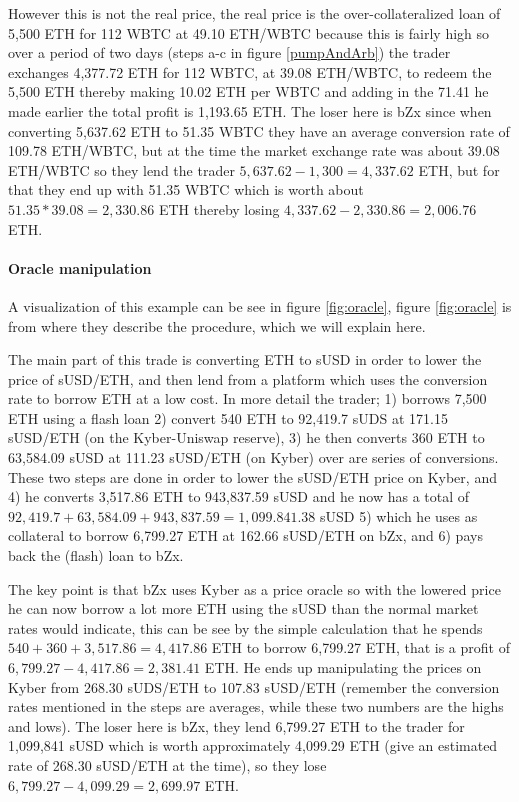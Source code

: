 However this is not the real price, the real price is the
over-collateralized loan of 5,500 ETH for 112 WBTC at 49.10 ETH/WBTC
because this is fairly high so over a period of two days (steps a-c in
figure \ref{pumpAndArb}) the trader exchanges 4,377.72 ETH for 112
WBTC, at 39.08 ETH/WBTC, to redeem the 5,500 ETH thereby making 10.02
ETH per WBTC and adding in the 71.41 he made earlier the total profit
is 1,193.65 ETH. The loser here is bZx since when converting 5,637.62
ETH to 51.35 WBTC they have an average conversion rate of 109.78
ETH/WBTC, but at the time the market exchange rate was about 39.08
ETH/WBTC so they lend the trader $5,637.62-1,300=4,337.62$ ETH, but
for that they end up with 51.35 WBTC which is worth about
$51.35*39.08=2,330.86$ ETH thereby losing $4,337.62-2,330.86=2,006.76$
ETH.

\paragraph{Oracle manipulation} A visualization of this example can be
see in figure \ref{fig:oracle}, figure \ref{fig:oracle} is from
\cite{attack} where they describe the procedure, which we will explain
here.

The main part of this trade is converting ETH to sUSD in order to
lower the price of sUSD/ETH, and then lend from a platform which uses
the conversion rate to borrow ETH at a low cost. In more detail the
trader; 1) borrows 7,500 ETH using a flash loan 2) convert 540 ETH to
92,419.7 sUDS at 171.15 sUSD/ETH (on the Kyber-Uniswap reserve), 3) he
then converts 360 ETH to 63,584.09 sUSD at 111.23 sUSD/ETH (on Kyber)
over are series of conversions. These two steps are done in order to
lower the sUSD/ETH price on Kyber, and 4) he converts 3,517.86 ETH to
943,837.59 sUSD and he now has a total of
$92,419.7+63,584.09+943,837.59=1,099.841.38$ sUSD 5) which he uses as
collateral to borrow 6,799.27 ETH at 162.66 sUSD/ETH on bZx, and 6)
pays back the (flash) loan to bZx.

The key point is that bZx uses Kyber as a price oracle so with the
lowered price he can now borrow a lot more ETH using the sUSD than the
normal market rates would indicate, this can be see by the simple
calculation that he spends $540+360+3,517.86=4,417.86$ ETH to borrow
6,799.27 ETH, that is a profit of $6,799.27-4,417.86=2,381.41$ ETH. He
ends up manipulating the prices on Kyber from 268.30 sUDS/ETH to
107.83 sUSD/ETH (remember the conversion rates mentioned in the steps
are averages, while these two numbers are the highs and lows). The
loser here is bZx, they lend 6,799.27 ETH to the trader for 1,099,841
sUSD which is worth approximately 4,099.29 ETH (give an estimated rate
of 268.30 sUSD/ETH at the time), so they lose
$6,799.27-4,099.29=2,699.97$ ETH.